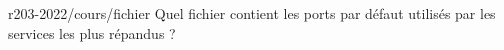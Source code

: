 \begin{question}{r203-2022/cours/fichier}
  Quel fichier contient les ports par défaut utilisés par les services
  les plus répandus ?
  \begin{reponses}
  \end{reponses}
\end{question}
